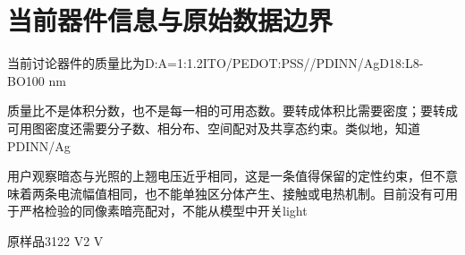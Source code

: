 \documentclass[11pt,a4paper]{article}
\begin{document}
\section{{\cjkfont 当前器件信息与原始数据边界}\allowbreak{}}\label{sec:8}
{\cjkfont 当前讨论器件的质量比为}\allowbreak{}D:A=\allowbreak{}1:1.2\allowbreak{}ITO/PEDOT:PSS/\allowbreak{}/PDINN/Ag\allowbreak{}D18:L8-BO\allowbreak{}100 nm\allowbreak{}
\par
{\cjkfont 质量比不是体积分数，也不是每一相的可用态数。要转成体积比需要密度；要转成可用图密度还需要分子数、相分布、空间配对及共享态约束。类似地，知道}\allowbreak{}PDINN/Ag\allowbreak{}
\par
{\cjkfont 用户观察暗态与光照的上翘电压近乎相同，这是一条值得保留的定性约束，但不意味着两条电流幅值相同，也不能单独区分体产生、接触或电热机制。目前没有可用于严格检验的同像素暗亮配对，不能从模型中开关}\allowbreak{}light\allowbreak{}
\par
{\cjkfont 原样品}\allowbreak{}3\allowbreak{}1\allowbreak{}2\allowbreak{}2 V\allowbreak{}2 V\allowbreak{}
\par
\end{document}
